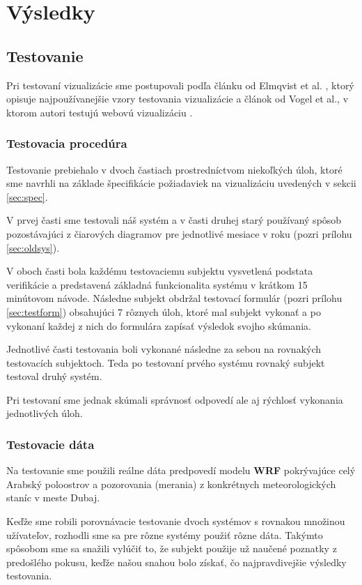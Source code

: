 \chapter{Výsledky}

\section{Testovanie}
Pri testovaní vizualizácie sme postupovali podľa článku od Elmqvist et al. \cite{Patterns}, ktorý opisuje najpoužívanejšie vzory testovania vizualizácie a článok od Vogel et al., v ktorom autori testujú webovú vizualizáciu \cite{WebBasedUserTest}.

\subsection{Testovacia procedúra}
Testovanie prebiehalo v dvoch častiach prostredníctvom niekoľkých úloh, ktoré sme navrhli na základe špecifikácie požiadaviek na vizualizáciu uvedených v sekcii \ref{sec:spec}.

V prvej časti sme testovali náš systém a v časti druhej starý používaný spôsob pozostávajúci z čiarových diagramov pre jednotlivé mesiace v roku (pozri prílohu \ref{sec:oldsys}).

V oboch časti bola každému testovaciemu subjektu vysvetlená podstata verifikácie a predstavená základná funkcionalita systému v krátkom 15 minútovom návode. Následne subjekt obdržal testovací formulár (pozri prílohu \ref{sec:testform}) obsahujúci 7 rôznych úloh, ktoré mal subjekt vykonať a po vykonaní každej z nich do formulára zapísať výsledok svojho skúmania.

Jednotlivé časti testovania boli vykonané následne za sebou na rovnakých testovacích subjektoch. Teda po testovaní prvého systému rovnaký subjekt testoval druhý systém.

Pri testovaní sme jednak skúmali správnosť odpovedí ale aj rýchlosť vykonania jednotlivých úloh.

\subsection{Testovacie dáta}
Na testovanie sme použili reálne dáta predpovedí modelu \textbf{WRF} pokrývajúce celý Arabský poloostrov a pozorovania (merania) z konkrétnych meteorologických staníc v meste Dubaj.

Keďže sme robili porovnávacie testovanie dvoch systémov s rovnakou množinou užívateľov, rozhodli sme sa pre rôzne systémy použiť rôzne dáta. Takýmto spôsobom sme sa snažili vylúčiť to, že subjekt použije už naučené poznatky z predošlého pokusu, keďže našou snahou bolo získať, čo najpravdivejšie výsledky testovania. 

